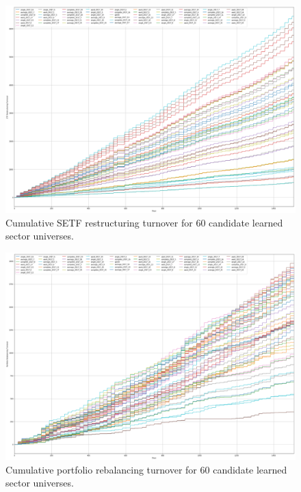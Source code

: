 \documentclass[../main.tex]{subfiles}
\begin{document}
\newpage
\begin{figure}
    \centering
    \includegraphics[width=\linewidth]{images/all_setf_restructuring_turnover.png}
    \caption{Cumulative SETF restructuring turnover for 60 candidate learned sector universes.}
    \label{fig:appendix_backtest:setf_restructuring_turnover}
\end{figure}

\newpage
\begin{figure}
    \centering
    \includegraphics[width=\linewidth]{images/all_portfolio_rebalancing_turnover.png}
    \caption{Cumulative portfolio rebalancing turnover for 60 candidate learned sector universes.}
    \label{fig:appendix_backtest:portfolio_rebal_turnover}
\end{figure}
\end{document}
